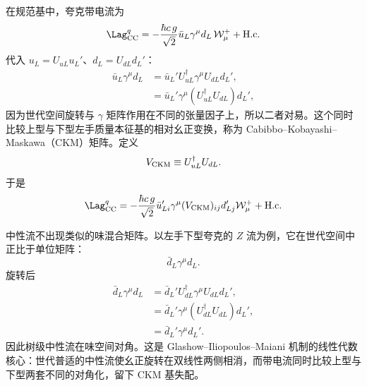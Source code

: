 \begin{definition}
在规范基中，夸克带电流为
\begin{equation*}
 \Lag_{\rm CC}^{q}
 =-\frac{\hbar c\,g}{\sqrt2}
 \bar u_L\gamma^\mu d_L\,\mathcal W_\mu^+
 +\mathrm{H.c.}
\end{equation*}
代入 $u_L=U_{uL}u_L'$、$d_L=U_{dL}d_L'$：
\begin{align*}
 \bar u_L\gamma^\mu d_L
 &=\bar u_L'U_{uL}^\dagger\gamma^\mu U_{dL}d_L',\\
 &=\bar u_L'\gamma^\mu
 \left(U_{uL}^\dagger U_{dL}\right)d_L',
\end{align*}
因为世代空间旋转与 $\gamma$ 矩阵作用在不同的张量因子上，所以二者对易。这个同时比较上型与下型左手质量本征基的相对幺正变换，称为 Cabibbo--Kobayashi--Maskawa（CKM）矩阵。定义
\begin{equation}
 {V_{\rm CKM}\equiv U_{uL}^\dagger U_{dL}.}
 \label{eq:ckm-definition-dp11}
\end{equation}
于是
\begin{equation}
 {
 \Lag_{\rm CC}^{q}
 =-\frac{\hbar c\,g}{\sqrt2}
 \bar u_{Li}'\gamma^\mu(V_{\rm CKM})_{ij}d_{Lj}'
 \mathcal W_\mu^+
 +\mathrm{H.c.}}
 \label{eq:quark-cc-ckm-dp11}
\end{equation}
\end{definition}



\begin{proposition}[世代普适中性流的味对角性]
中性流不出现类似的味混合矩阵。以左手下型夸克的 $Z$ 流为例，它在世代空间中正比于单位矩阵：
\begin{equation*}
 \bar d_L\gamma^\mu d_L.
\end{equation*}
旋转后
\begin{align*}
 \bar d_L\gamma^\mu d_L
 &=\bar d_L'U_{dL}^\dagger\gamma^\mu U_{dL}d_L',\\
 &=\bar d_L'\gamma^\mu
 (U_{dL}^\dagger U_{dL})d_L',\\
 &=\bar d_L'\gamma^\mu d_L'.
\end{align*}
因此树级中性流在味空间对角。这是 Glashow--Iliopoulos--Maiani 机制的线性代数核心：世代普适的中性流使幺正旋转在双线性两侧相消，而带电流同时比较上型与下型两套不同的对角化，留下 CKM 基失配。
\end{proposition}

